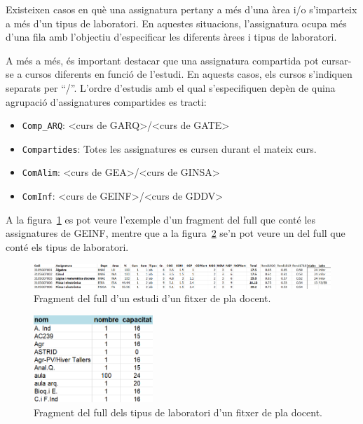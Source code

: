 \documentclass[a4paper,12pt]{ThesisStyle}
\begin{document}
Existeixen casos en què una assignatura pertany a més d'una àrea i/o s'imparteix a més d'un tipus de laboratori. En aquestes situacions, l'assignatura ocupa més d'una fila amb l'objectiu d'especificar les diferents àrees i tipus de laboratori.

A més a més, és important destacar que una assignatura compartida pot cursar-se a cursos diferents en funció de l'estudi. En aquests casos, els cursos s'indiquen separats per ``/''. L'ordre d'estudis amb el qual s'especifiquen depèn de quina agrupació d'assignatures compartides es tracti:
\begin{itemize}
  \item \texttt{Comp\_ARQ}: <curs de GARQ>/<curs de GATE>
  \item \texttt{Compartides}: Totes les assignatures es cursen durant el mateix curs.
  \item \texttt{ComAlim}: <curs de GEA>/<curs de GINSA>
  \item \texttt{ComInf}: <curs de GEINF>/<curs de GDDV>
\end{itemize}

A la figura~\ref{img:frag_pla_docent} es pot veure l'exemple d'un fragment del full que conté les assignatures de GEINF, mentre que a la figura~\ref{img:frag_pla_docent_labs} se'n pot veure un del full que conté els tipus de laboratori.

\begin{figure}[H]
  \centering
  \includegraphics[width=\textwidth]{assets/figs/fitxerPlaDocent.png}
  \caption{\label{img:frag_pla_docent}Fragment del full d'un estudi d'un fitxer de pla docent.}
\end{figure}

\begin{figure}[H]
  \centering
  \includegraphics[width=0.4\textwidth]{assets/figs/fitxerPlaDocentLabs.png}
  \caption{\label{img:frag_pla_docent_labs}Fragment del full dels tipus de laboratori d'un fitxer de pla docent.}
\end{figure}
\end{document}

